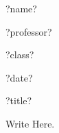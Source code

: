 \documentclass[12pt,letterpaper]{article}
\begin{document}
\doublespacing
\noindent %
?name?

\noindent
?professor?

\noindent
?class?

\noindent
?date?

\centerline{?title?}

Write Here.

\end{document}
